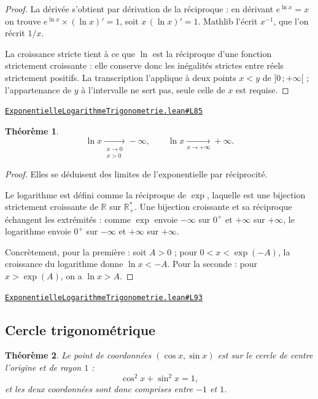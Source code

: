 \documentclass[11pt,a4paper]{article}
\theoremstyle{definition}
\theoremstyle{plain}
\newtheorem{theoreme}{Théorème}
\newcommand{\source}[2]{\par\smallskip\noindent\hfill{\footnotesize\href{#1}{\texttt{#2}}}\par\smallskip}
\begin{document}
\begin{proof}
La dérivée s'obtient par dérivation de la réciproque : en dérivant $e^{\ln x} = x$ on
trouve $e^{\ln x} \times (\ln x)' = 1$, soit $x\,(\ln x)' = 1$. Mathlib l'écrit $x^{-1}$,
que l'on récrit $1/x$.

La croissance stricte tient à ce que $\ln$ est la réciproque d'une fonction strictement
croissante : elle conserve donc les inégalités strictes entre réels strictement positifs.
La transcription l'applique à deux points $x < y$ de $]0\,;+\infty[$ ; l'appartenance de $y$ à
l'intervalle ne sert pas, seule celle de $x$ est requise.
\end{proof}
\source{https://github.com/Commutator-IO/learn-lean/blob/main/courses/02-lycee/05-exponentielle-logarithme-trigonometrie/ExponentielleLogarithmeTrigonometrie.lean\#L85}{ExponentielleLogarithmeTrigonometrie.lean\#L85}

\begin{theoreme}
\[ \ln x \xrightarrow[\substack{x \to 0 \\ x > 0}]{} -\infty , \qquad
   \ln x \xrightarrow[x \to +\infty]{} +\infty . \]
\end{theoreme}

\begin{proof}
Elles se déduisent des limites de l'exponentielle par réciprocité.

Le logarithme est défini comme la réciproque de $\exp$, laquelle est une bijection
strictement croissante de $\mathbb{R}$ sur $\mathbb{R}_{+}^{*}$. Une bijection croissante et
sa réciproque échangent les extrémités : comme $\exp$ envoie $-\infty$ sur $0^{+}$ et
$+\infty$ sur $+\infty$, le logarithme envoie $0^{+}$ sur $-\infty$ et $+\infty$ sur
$+\infty$.

Concrètement, pour la première : soit $A > 0$ ; pour $0 < x < \exp(-A)$, la croissance du
logarithme donne $\ln x < -A$. Pour la seconde : pour $x > \exp(A)$, on a $\ln x > A$.
\end{proof}
\source{https://github.com/Commutator-IO/learn-lean/blob/main/courses/02-lycee/05-exponentielle-logarithme-trigonometrie/ExponentielleLogarithmeTrigonometrie.lean\#L93}{ExponentielleLogarithmeTrigonometrie.lean\#L93}

\subsection{Cercle trigonométrique}

\begin{theoreme}
Le point de coordonnées $(\cos x, \sin x)$ est sur le cercle de centre l'origine et de
rayon $1$ :
\[ \cos^{2} x + \sin^{2} x = 1 , \]
et les deux coordonnées sont donc comprises entre $-1$ et $1$.
\end{theoreme}
\end{document}
